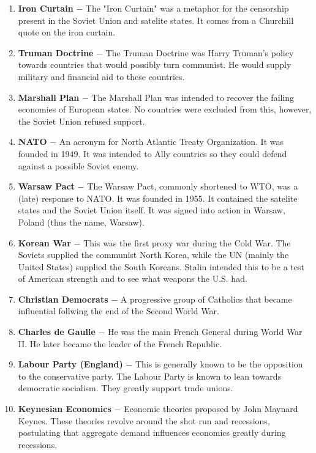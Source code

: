 \documentclass[12pt]{article}
\begin{document}
\begin{flushleft}
\begin{enumerate}
	\item \textbf{Iron Curtain} $-$ The "Iron Curtain" was a metaphor for the censorship present in the Soviet Union and satelite states. It comes from a Churchill quote on the iron curtain. 

	\item \textbf{Truman Doctrine} $-$ The Truman Doctrine was Harry Truman's policy towards countries that would possibly turn communist. He would supply military and financial aid to these countries.

	\item \textbf{Marshall Plan} $-$ The Marshall Plan was intended to recover the failing economies of European states. No countries were excluded from this, however, the Soviet Union refused support.

	\item \textbf{NATO} $-$ An acronym for North Atlantic Treaty Organization. It was founded in 1949. It was intended to Ally countries so they could defend against a possible Soviet enemy.

    \item \textbf{Warsaw Pact} $-$ The Warsaw Pact, commonly shortened to WTO, was a (late) response to NATO. It was founded in 1955. It contained the satelite states and the Soviet Union itself. It was signed into action in Warsaw, Poland (thus the name, Warsaw).
    

    \item \textbf{Korean War} $-$ This was the first proxy war during the Cold War. The Soviets supplied the communist North Korea, while the UN (mainly the United States) supplied the South Koreans. Stalin intended this to be a test of American strength and to see what weapons the U.S. had.

	\item \textbf{Christian Democrats} $-$ A progressive group of Catholics that became influential follwing the end of the Second World War.

	\item \textbf{Charles de Gaulle} $-$ He was the main French General during World War II. He later became the leader of the French Republic.

	\item \textbf{Labour Party (England)} $-$ This is generally known to be the opposition to the conservative party. The Labour Party is known to lean towards democratic socialism. They greatly support trade unions.

	\item \textbf{Keynesian Economics} $-$ Economic theories proposed by John Maynard Keynes. These theories revolve around the shot run and recessions, postulating that aggregate demand influences economics greatly during recessions.


\end{enumerate}
\end{flushleft}
\end{document}
